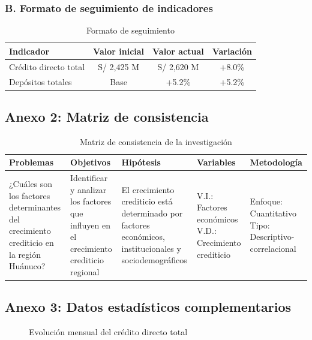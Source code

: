 \documentclass[12pt, a4paper]{article}
\begin{document}
\subsubsection*{B. Formato de seguimiento de indicadores}
\begin{table}[ht]
\centering
\begin{tabular}{|l|c|c|c|}
\hline
\textbf{Indicador} & \textbf{Valor inicial} & \textbf{Valor actual} & \textbf{Variación} \\
\hline
Crédito directo total & S/ 2,425 M & S/ 2,620 M & +8.0\% \\
Depósitos totales & Base & +5.2\% & +5.2\% \\
\hline
\end{tabular}
\caption{Formato de seguimiento}
\end{table}

\subsection*{Anexo 2: Matriz de consistencia}

\begin{table}[ht]
\centering
\begin{tabular}{|p{3cm}|p{2cm}|p{2cm}|p{3cm}|p{3cm}|}
\hline
\textbf{Problemas} & \textbf{Objetivos} & \textbf{Hipótesis} & \textbf{Variables} & \textbf{Metodología} \\
\hline
¿Cuáles son los factores determinantes del crecimiento crediticio en la región Huánuco? & 
Identificar y analizar los factores que influyen en el crecimiento crediticio regional & 
El crecimiento crediticio está determinado por factores económicos, institucionales y sociodemográficos & 
V.I.: Factores económicos\newline
V.D.: Crecimiento crediticio & 
Enfoque: Cuantitativo\newline
Tipo: Descriptivo-correlacional \\
\hline
\end{tabular}
\caption{Matriz de consistencia de la investigación}
\end{table}


\subsection*{Anexo 3: Datos estadísticos complementarios}

\begin{figure}[ht]
\centering
{}
\caption{Evolución mensual del crédito directo total}
\end{figure}
\end{document}
